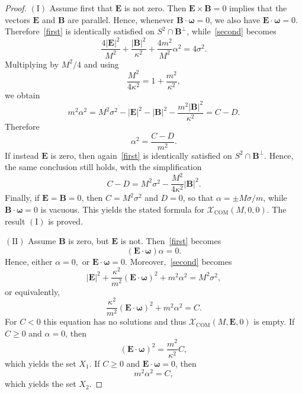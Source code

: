 \documentclass[12pt]{article}
\theoremstyle{plain}
\theoremstyle{definition}
\begin{document}
\begin{proof}
$\mathrm{(I)}$ Assume first that ${\bm E}$ is not zero. Then ${\bm E}\times{\bm B}=0$ implies that the vectors ${\bm E}$ and ${\bm B}$ are parallel. Hence, whenever ${\bm B}\cdot{\bm\omega}=0$, we also have ${\bm E}\cdot{\bm\omega}=0$.
Therefore~\eqref{first} is identically satisfied on $S^2\cap{\bm B}^{\perp}$, while~\eqref{second} becomes
\[
\frac{4|{\bm E}|^2}{M^2}+\frac{|{\bm B}|^2}{\kappa^2}+\frac{4m^2}{M^2}\alpha^2
=4\sigma^2.
\]
Multiplying by $M^2/4$ and using
\[
\frac{M^2}{4\kappa^2}=1+\frac{m^2}{\kappa^2},
\]
we obtain
\[
m^2\alpha^2 =
M^2\sigma^2-|{\bm E}|^2-|{\bm B}|^2-\frac{m^2|{\bm B}|^2}{\kappa^2}= C-D.
\]
Therefore
\[
\alpha^2=\frac{C-D}{m^2}.
\]
If instead ${\bm E}$ is zero, then again~\eqref{first} is identically satisfied on $S^2\cap{\bm B}^{\perp}$. Hence, the same conclusion still holds, with the simplification
\[
C-D=M^2\sigma^2-\frac{M^2}{4\kappa^2}|\bm B|^2.
\]
Finally, if ${\bm E}={\bm B}=0$, then $C=M^2\sigma^2$ and $D=0$,
so that
$\alpha=\pm M\sigma/m$,
while ${\bm B}\cdot{\bm\omega}=0$ is vacuous. This yields the stated formula for
$\mathcal X_{\mathrm{COM}}(M,0,0)$.
The result $\mathrm{(I)}$ is proved. 

$\mathrm{(II)}$ Assume ${\bm B}$ is zero, but ${\bm E}$ is not. 
Then~\eqref{first} becomes
\[
({\bm E}\cdot{\bm\omega})\alpha=0.
\]
Hence, either
$
\alpha=0,
$
or
$
{\bm E}\cdot{\bm\omega}=0.
$
Moreover,~\eqref{second} becomes
\[
|{\bm E}|^2
+\frac{\kappa^2}{m^2}({\bm E}\cdot{\bm\omega})^2
+m^2\alpha^2
=M^2\sigma^2,
\]
or equivalently,
\[
\frac{\kappa^2}{m^2}({\bm E}\cdot{\bm\omega})^2
+m^2\alpha^2
=C.
\]
For $C<0$ this equation has no solutions and thus $\mathcal X_{\mathrm{COM}}(M,{\bm E},0)$ is empty. If $C\geq 0$ and $\alpha=0$, then
\[
({\bm E}\cdot{\bm\omega})^2
=\frac{m^2}{\kappa^2}C,
\]
which yields the set $X_1$.
If $C\geq 0$ and ${\bm E}\cdot{\bm\omega}=0$, then
\[
m^2\alpha^2=C,
\]
which yields the set $X_2$.
\end{proof}
\end{document}
